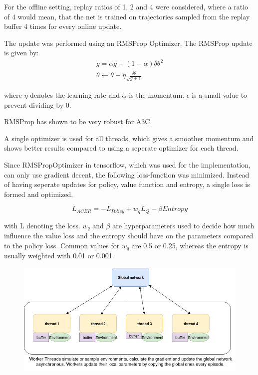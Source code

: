 For the offline setting, replay ratios of 1, 2 and 4 were considered, where a ratio of 4 would mean, that the net is trained on trajectories sampled from the replay buffer 4 times for every online update.

The update was performed using an RMSProp Optimizer.
The RMSProp update is given by:
\begin{align}
g = \alpha g + (1- \alpha) \delta \theta^2 \\ \theta \gets \theta - \eta \frac{\delta \theta}{ \sqrt{g+\epsilon}}
\end{align}

where $\eta$ denotes the learning rate and $\alpha$ is the momentum. $\epsilon$ is a small value to prevent dividing by 0.

RMSProp has shown to be very robust for A3C. \citep{A3C}

A single optimizer is used for all threads, which gives a smoother momentum and shows better results compared to using a seperate optimizer for each thread.

Since RMSPropOptimizer in tensorflow, which was used for the implementation, can only use gradient decent, the following loss-function was minimized. Instead of having seperate updates for policy, value function and entropy, a single loss is formed and optimized.

\begin{equation}
L_{ACER} = - L_{Policy} + w_q L_{Q} - \beta Entropy
\end{equation}

with L denoting the loss. $w_q$ and $\beta$ are hyperparameters used to decide how much influence the value loss and the entropy should have on the parameters compared to the policy loss. Common values for $w_q$ are 0.5 or 0.25, whereas the entropy is usually weighted with 0.01 or 0.001.

\begin{figure}
\includegraphics[scale=0.5]{bilder/ACERarchitecture.png}
\end{figure}
\pagebreak
